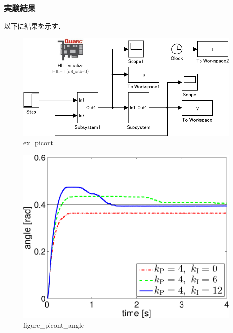\subsubsection{実験結果}
以下に結果を示す．
\begin{figure}[h]
  \centering
  \includegraphics[scale=0.7]{sozai/ex_picont-crop.pdf}
  \caption{ex\_picont}
\end{figure}

\begin{figure}[h]
  \centering
  \includegraphics[scale=0.5]{sozai/figure_picont_angle-crop.pdf}
  \caption{figure\_picont\_angle}
\end{figure}

